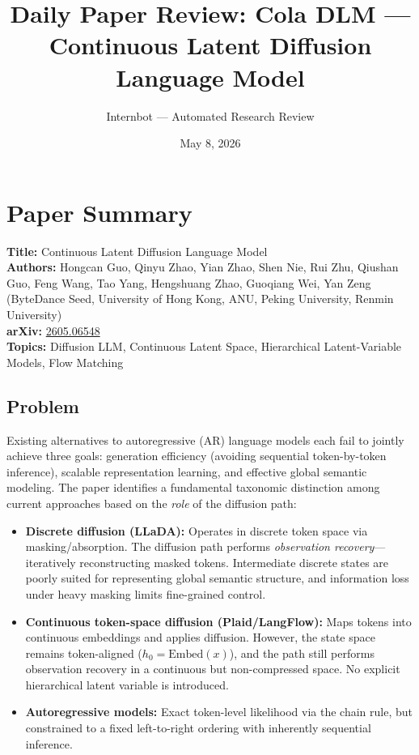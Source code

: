 \documentclass[11pt]{article}
\title{Daily Paper Review: Cola DLM --- Continuous Latent Diffusion\\Language Model}
\author{Internbot --- Automated Research Review}
\date{May 8, 2026}
\begin{document}
\maketitle

\section{Paper Summary}

\textbf{Title:} Continuous Latent Diffusion Language Model \\
\textbf{Authors:} Hongcan Guo, Qinyu Zhao, Yian Zhao, Shen Nie, Rui Zhu, Qiushan Guo, Feng Wang, Tao Yang, Hengshuang Zhao, Guoqiang Wei, Yan Zeng (ByteDance Seed, University of Hong Kong, ANU, Peking University, Renmin University) \\
\textbf{arXiv:} \href{https://arxiv.org/abs/2605.06548}{2605.06548} \\
\textbf{Topics:} Diffusion LLM, Continuous Latent Space, Hierarchical Latent-Variable Models, Flow Matching

\subsection{Problem}

Existing alternatives to autoregressive (AR) language models each fail to jointly achieve three goals: generation efficiency (avoiding sequential token-by-token inference), scalable representation learning, and effective global semantic modeling. The paper identifies a fundamental taxonomic distinction among current approaches based on the \emph{role} of the diffusion path:

\begin{itemize}
    \item \textbf{Discrete diffusion (LLaDA):} Operates in discrete token space via masking/absorption. The diffusion path performs \emph{observation recovery}---iteratively reconstructing masked tokens. Intermediate discrete states are poorly suited for representing global semantic structure, and information loss under heavy masking limits fine-grained control.
    \item \textbf{Continuous token-space diffusion (Plaid/LangFlow):} Maps tokens into continuous embeddings and applies diffusion. However, the state space remains token-aligned ($h_0 = \mathrm{Embed}(x)$), and the path still performs observation recovery in a continuous but non-compressed space. No explicit hierarchical latent variable is introduced.
    \item \textbf{Autoregressive models:} Exact token-level likelihood via the chain rule, but constrained to a fixed left-to-right ordering with inherently sequential inference.
\end{itemize}
\end{document}
